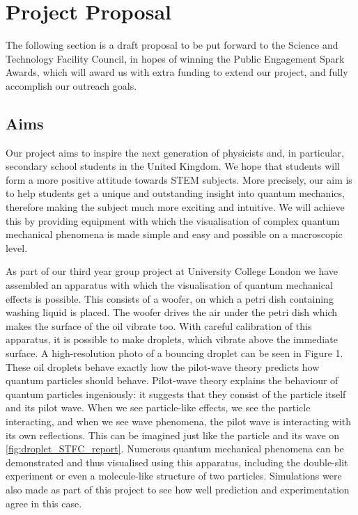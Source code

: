 \section{Project Proposal}
The following section is a draft proposal to be put forward to the  Science and Technology Facility Council, in hopes of winning the Public Engagement Spark Awards, which will award us with extra funding to extend our project, and fully accomplish our outreach goals. 
\subsection{Aims}

Our project aims to inspire the next generation of physicists and, in particular, secondary school students in the United Kingdom. We hope that students will form a more positive attitude towards STEM subjects. More precisely, our aim is to help students get a unique and outstanding insight into quantum mechanics, therefore making the subject much more exciting and intuitive. We will achieve this by providing equipment with which the visualisation of complex quantum mechanical phenomena is made simple and easy and possible on a macroscopic level.

As part of our third year group project at University College London we have assembled an apparatus with which the visualisation of quantum mechanical effects is possible. This consists of a woofer, on which a petri dish containing washing liquid is placed. The woofer drives the air under the petri dish which makes the surface of the oil vibrate too. With careful calibration of this apparatus, it is possible to make droplets, which vibrate above the immediate surface. A high-resolution photo of a bouncing droplet can be seen in Figure 1. These oil droplets behave exactly how the pilot-wave theory predicts how quantum particles should behave. Pilot-wave theory explains the behaviour of quantum particles ingeniously: it suggests that they consist of the particle itself and its pilot wave. When we see particle-like effects, we see the particle interacting, and when we see wave phenomena, the pilot wave is interacting with its own reflections. This can be imagined just like the particle and its wave on \ref{fig:droplet_STFC_report}. Numerous quantum mechanical phenomena can be demonstrated and thus visualised using this apparatus, including the double-slit experiment or even a molecule-like structure of two particles. Simulations were also made as part of this project to see how well prediction and experimentation agree in this case.  

